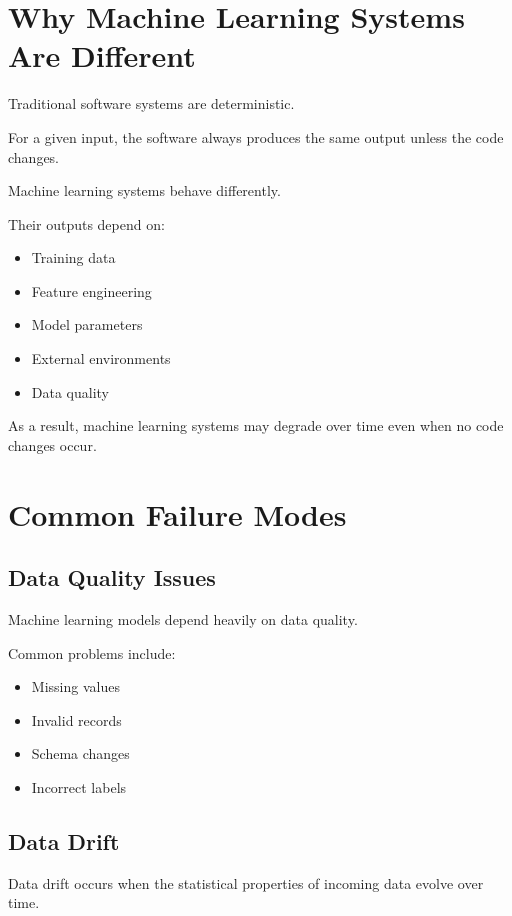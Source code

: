 \section{Why Machine Learning Systems Are Different}

Traditional software systems are deterministic.

For a given input, the software always produces the same output unless the code changes.

Machine learning systems behave differently.

Their outputs depend on:

\begin{itemize}
    \item Training data
    \item Feature engineering
    \item Model parameters
    \item External environments
    \item Data quality
\end{itemize}

As a result, machine learning systems may degrade over time even when no code changes occur.

\section{Common Failure Modes}

\subsection{Data Quality Issues}

Machine learning models depend heavily on data quality.

Common problems include:

\begin{itemize}
    \item Missing values
    \item Invalid records
    \item Schema changes
    \item Incorrect labels
\end{itemize}

\subsection{Data Drift}

Data drift occurs when the statistical properties of incoming data evolve over time.

